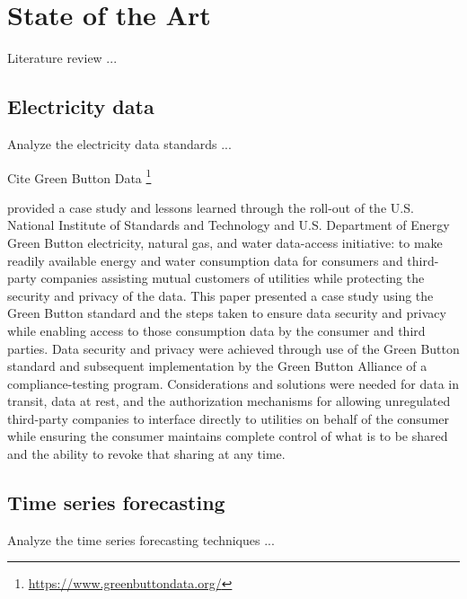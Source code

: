 \chapter{State of the Art}
\label{cha:soa}
\vspace{0.4 cm}

Literature review ...


\section{Electricity data}
\label{sec:data}
\vspace{0.2 cm}

Analyze the electricity data standards ...
\cite{CHEN201798}
\cite{8577770}
\cite{WILCOX2019250}
\cite{8284772}
\cite{5772503}

Cite Green Button Data \footnote{ \url{https://www.greenbuttondata.org/} }

\cite{Nguyen2019}  provided a case study and lessons learned through the roll-out of the U.S. National Institute of Standards and Technology and U.S. Department of Energy Green Button electricity, natural gas, and water data-access initiative: to make readily available energy and water consumption data for consumers and third-party companies assisting mutual customers of utilities while protecting the security and privacy of the data.
This paper presented a case study using the Green Button standard and the steps taken to ensure data security and privacy while enabling access to those consumption data by the consumer and third parties.
Data security and privacy were achieved through use of the Green Button standard and subsequent implementation by the Green Button Alliance of a compliance-testing program.
Considerations and solutions were needed for data in transit, data at rest, and the authorization mechanisms for allowing unregulated third-party companies to interface directly to utilities on behalf of the consumer while ensuring the consumer maintains complete control of what is to be shared and the ability to revoke that sharing at any time.


\section{Time series forecasting}
\label{sec:timeseries}
\vspace{0.2 cm}

Analyze the time series forecasting techniques ...
\cite{DEGOOIJER2006443}
\cite{SMYL202075}
\cite{Lim2021}
\cite{ZHANG2003159}
\cite{Nesreen2010}
\cite{SEZER2020106181}
\cite{en16031371}
\cite{HEWAMALAGE2021388}
\cite{BENTAIEB20127067}
\cite{CAO2003321}
\cite{LI2019104785}
\cite{DU2020269}
\cite{Sean2017}
\cite{Masini2023}
\cite{Borovykh2017}
\cite{SHEN2020302}
\cite{DEOSANTOSJUNIOR201972}
\cite{Athiyarath2020}
\cite{Cerqueira2020}
\cite{6210391}
\cite{TEALAB2018334}
\cite{Oliveira2015}
\cite{BERGMEIR2012192}

